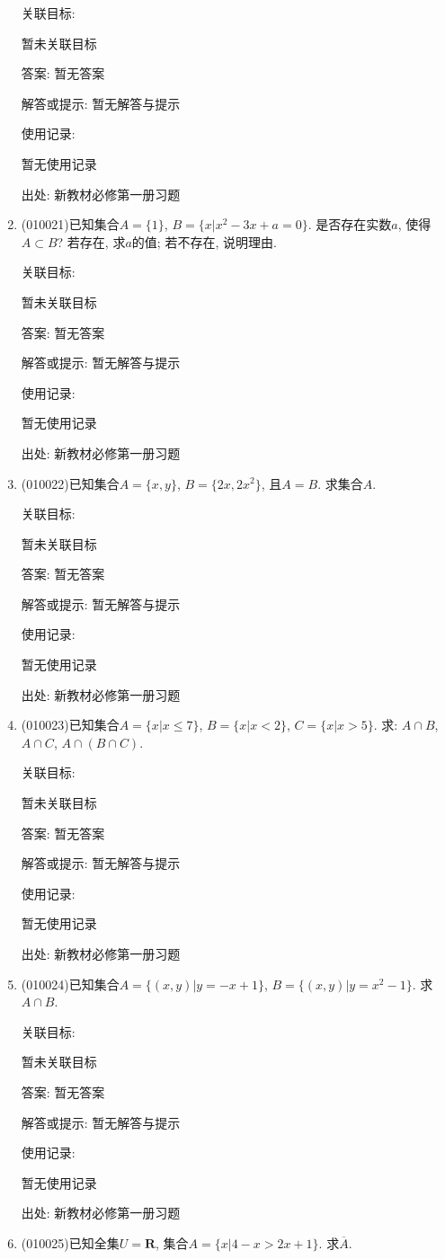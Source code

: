 \documentclass[10pt,a4paper]{article}
\begin{document}
\begin{enumerate}[1.]
关联目标:

暂未关联目标

答案: 暂无答案

解答或提示: 暂无解答与提示

使用记录:

暂无使用记录


出处: 新教材必修第一册习题
\item { (010021)}已知集合$A=\{1\}$, $B=\{x|x^2-3x+a=0\}$. 是否存在实数$a$, 使得$A\subset B$?  若存在, 求$a$的值; 若不存在, 说明理由.


关联目标:

暂未关联目标

答案: 暂无答案

解答或提示: 暂无解答与提示

使用记录:

暂无使用记录


出处: 新教材必修第一册习题
\item { (010022)}已知集合$A=\{x, y\}$, $B=\{2x, 2x^2\}$, 且$A=B$. 求集合$A$.


关联目标:

暂未关联目标

答案: 暂无答案

解答或提示: 暂无解答与提示

使用记录:

暂无使用记录


出处: 新教材必修第一册习题
\item { (010023)}已知集合$A=\{x|x\le 7\}$, $B=\{x|x<2\}$, $C=\{x|x>5\}$. 求: $A\cap B$, $A\cap C$, $A\cap (B\cap C)$.


关联目标:

暂未关联目标

答案: 暂无答案

解答或提示: 暂无解答与提示

使用记录:

暂无使用记录


出处: 新教材必修第一册习题
\item { (010024)}已知集合$A=\{(x, y)|y=-x+1\}$, $B=\{(x, y)|y=x^2-1\}$. 求$A\cap B$.


关联目标:

暂未关联目标

答案: 暂无答案

解答或提示: 暂无解答与提示

使用记录:

暂无使用记录


出处: 新教材必修第一册习题
\item { (010025)}已知全集$U=\mathbf{R}$, 集合$A=\{x|4-x>2x+1\}$. 求$\overline A$.



\end{enumerate}
\end{document}
